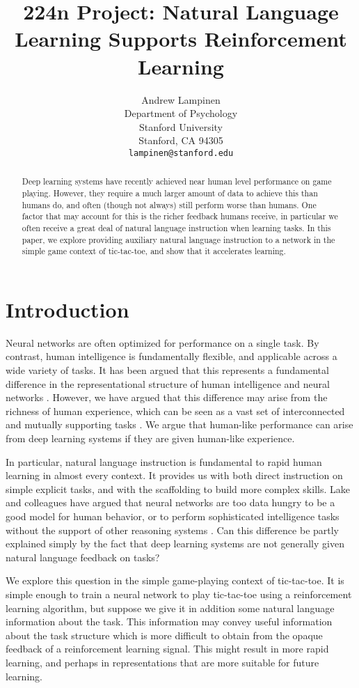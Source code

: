 \documentclass{article} %
\title{224n Project: Natural Language Learning Supports Reinforcement Learning}
\author{
Andrew Lampinen \\
Department of Psychology\\
Stanford University\\
Stanford, CA 94305 \\
\texttt{lampinen@stanford.edu} \\
}
\begin{document}
\maketitle

\begin{abstract}
Deep learning systems have recently achieved near human level performance on game playing. However, they require a much larger amount of data to achieve this than humans do, and often (though not always) still perform worse than humans. One factor that may account for this is the richer feedback humans receive, in particular we often receive a great deal of natural language instruction when learning tasks. In this paper, we explore providing auxiliary natural language instruction to a network in the simple game context of tic-tac-toe, and show that it accelerates learning. 
\end{abstract}


\section{Introduction}
Neural networks are often optimized for performance on a single task. By contrast, human intelligence is fundamentally flexible, and applicable across a wide variety of tasks. It has been argued that this represents a fundamental difference in the representational structure of human intelligence and neural networks \cite{Lake2016}. However, we have argued that this difference may arise from the richness of human experience, which can be seen as a vast set of interconnected and mutually supporting tasks \cite{HansenInPress}. We argue that human-like performance can arise from deep learning systems if they are given human-like experience. \par
In particular, natural language instruction is fundamental to rapid human learning in almost every context. It provides us with both direct instruction on simple explicit tasks, and with the scaffolding to build more complex skills. Lake and colleagues have argued that neural networks are too data hungry to be a good model for human behavior, or to perform sophisticated intelligence tasks without the support of other reasoning systems \cite{Lake2016}. Can this difference be partly explained simply by the fact that deep learning systems are not generally given natural language feedback on tasks? \par 
We explore this question in the simple game-playing context of tic-tac-toe. It is simple enough to train a neural network to play tic-tac-toe using a reinforcement learning algorithm, but suppose we give it in addition some natural language information about the task. This information may convey useful information about the task structure which is more difficult to obtain from the opaque feedback of a reinforcement learning signal. This might result in more rapid learning, and perhaps in representations that are more suitable for future learning. \par 
\end{document}
